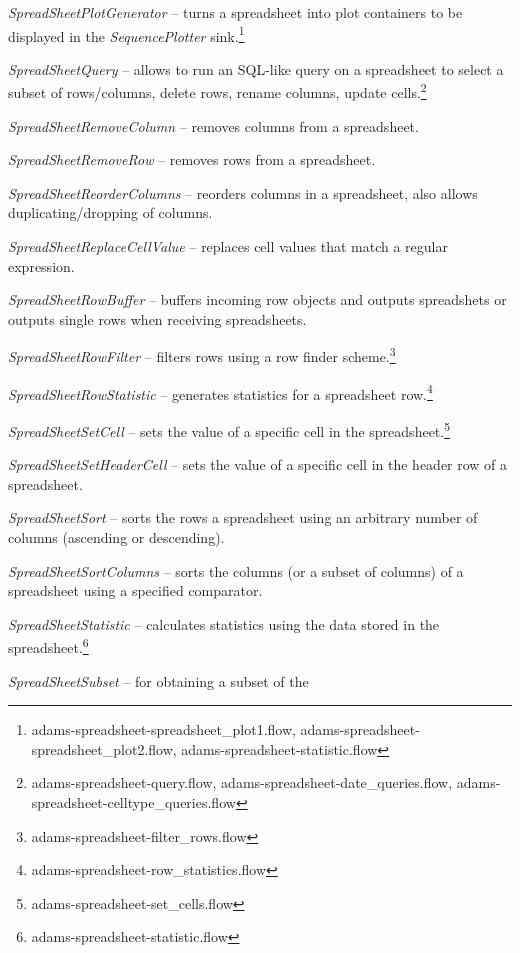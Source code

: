 \documentclass[a4paper]{book}
\begin{document}
\begin{tight_itemize}
	\item \textit{SpreadSheetPlotGenerator} -- turns a spreadsheet into plot
	containers to be displayed in the \textit{SequencePlotter} 
	sink.\footnote{adams-spreadsheet-spreadsheet\_plot1.flow, 
	adams-spreadsheet-spreadsheet\_plot2.flow, adams-spreadsheet-statistic.flow}
	\item \textit{SpreadSheetQuery} -- allows to run an SQL-like query on a 
	spreadsheet to select a subset of rows/columns, delete rows, rename columns, 
	update cells.\footnote{adams-spreadsheet-query.flow, adams-spreadsheet-date\_queries.flow, 
	adams-spreadsheet-celltype\_queries.flow}
	\item \textit{SpreadSheetRemoveColumn} -- removes columns from a spreadsheet.
	\item \textit{SpreadSheetRemoveRow} -- removes rows from a spreadsheet.
	\item \textit{SpreadSheetReorderColumns} -- reorders columns in a spreadsheet, 
	also allows duplicating/dropping of columns.
	\item \textit{SpreadSheetReplaceCellValue} -- replaces cell values that
	match a regular expression.
	\item \textit{SpreadSheetRowBuffer} -- buffers incoming row objects and
	outputs spreadshets or outputs single rows when receiving spreadsheets.
	\item \textit{SpreadSheetRowFilter} -- filters rows using a row
	finder scheme.\footnote{adams-spreadsheet-filter\_rows.flow}
	\item \textit{SpreadSheetRowStatistic} -- generates statistics for a 
	spreadsheet row.\footnote{adams-spreadsheet-row\_statistics.flow}
	\item \textit{SpreadSheetSetCell} -- sets the value of a specific cell
	in the spreadsheet.\footnote{adams-spreadsheet-set\_cells.flow}
	\item \textit{SpreadSheetSetHeaderCell} -- sets the value of a specific cell
	in the header row of a spreadsheet.
	\item \textit{SpreadSheetSort} -- sorts the rows a spreadsheet using an arbitrary
	number of columns (ascending or descending).
	\item \textit{SpreadSheetSortColumns} -- sorts the columns (or a subset of
	columns) of a spreadsheet using a specified comparator.
	\item \textit{SpreadSheetStatistic} -- calculates statistics using the
	data stored in the spreadsheet.\footnote{adams-spreadsheet-statistic.flow}
	\item \textit{SpreadSheetSubset} -- for obtaining a subset of the 

\end{tight_itemize}
\end{document}
